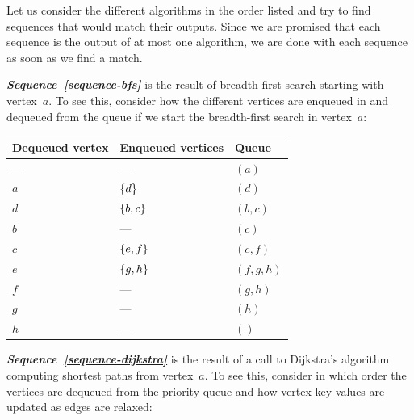 \documentclass{jn-pset}
\begin{document}
\begin{problem}
  \begin{solution}
  Let us consider the different algorithms in the order listed and
  try to find sequences that would match their outputs.
  Since we are promised that each sequence is the output of at most
  one algorithm, we are done with each sequence as soon as we find a
  match.
  
  \textit{\textbf{Sequence~\ref{sequence-bfs}}}
  is the result of breadth-first search starting with vertex~$a$.
  To see this, consider how the different vertices are enqueued in and
  dequeued from the queue if we start the breadth-first search in
  vertex~$a$:

  \medskip
  \noindent
  \begin{tabular}[]{|l|l|l|}
    \hline
    \textbf{Dequeued vertex}
    &
      \textbf{Enqueued vertices}
    &
      \textbf{Queue}
    \\
    \hline
    ---
    &
      ---
    &
      $(a)$
    \\
    $a$
    &
      $\{ d \}$
    &
      $(d)$
      \\
    $d$
    &
      $\{ b, c \}$
    &
      $(b, c)$
    \\
    $b$
    &
      ---
    &
      $(c)$
    \\
    $c$
    &
      $\{ e, f \}$
    &
      $(e, f)$
    \\
    $e$
    &
      $\{ g, h \}$
    &
      $(f, g, h)$
    \\
    $f$
    &
      ---
    &
      $(g, h)$
    \\
    $g$
    &
      ---
    &
      $(h)$
    \\
    $h$
    &
      ---
    &
      $()$
    \\
    \hline
  \end{tabular}

  \bigskip

  
  \textit{\textbf{Sequence~\ref{sequence-dijkstra}}}
  is the result of a call to Dijkstra's algorithm computing shortest
  paths from vertex~$a$.
  To see this, consider in which order the vertices are dequeued from
  the priority queue and how vertex key values are updated as edges
  are relaxed:


\end{solution}
\end{problem}
\end{document}

